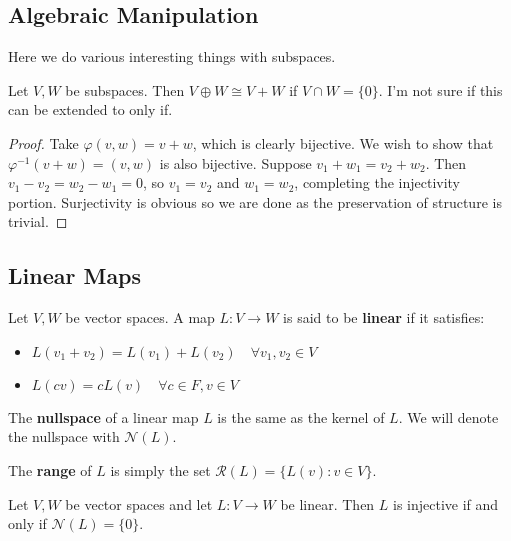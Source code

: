 \subsection{Algebraic Manipulation}
Here we do various interesting things with subspaces.

\begin{prop}
Let $V, W$ be subspaces. Then $V \oplus W \cong V + W$ if $V \cap W =
\lbrace 0 \rbrace$. I'm not sure if this can be extended to only if.
\end{prop}

\begin{proof}
Take $\varphi(v, w) = v + w$, which is clearly bijective. We wish to
show that $\varphi^{-1}(v + w) = (v, w)$ is also bijective. Suppose $v_1
+ w_1 = v_2 + w_2$. Then $v_1 - v_2 = w_2 - w_1 = 0$, so $v_1 = v_2$ and
$w_1 = w_2$, completing the injectivity portion. Surjectivity is obvious
so we are done as the preservation of structure is trivial.
\end{proof}

\subsection{Linear Maps}
\begin{df}
Let $V, W$ be vector spaces.  A map $L : V \rightarrow W$ is said to be
\textbf{linear} if it satisfies:
\begin{itemize}
\item $L(v_1 + v_2) = L(v_1) + L(v_2) \quad \forall v_1, v_2 \in V$
\item $L(c v) = c L(v) \quad \forall c \in F, v \in V$
\end{itemize}
\end{df}

\begin{df}
The \textbf{nullspace} of a linear map $L$ is the same as the kernel of
$L$. We will denote the nullspace with $\mathcal{N}(L)$.
\end{df}

\begin{df}
The \textbf{range} of $L$ is simply the set $\mathcal{R}(L) = \lbrace
L(v) : v \in V \rbrace$.
\end{df}

\begin{prop}
Let $V, W$ be vector spaces and let $L : V \rightarrow W$ be linear.
Then $L$ is injective if and only if $\mathcal{N}(L) = \lbrace 0
\rbrace$.
\end{prop}

